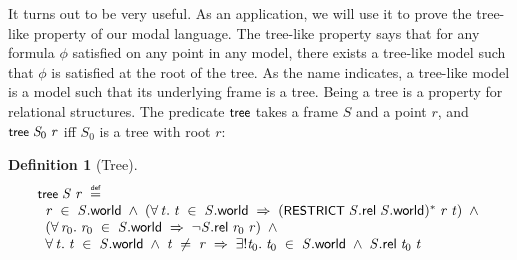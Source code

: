 \documentclass[letterpaper]{article}
\newtheorem{defn}{Definition}
\renewcommand{\HOLConst}[1]{{\textsf{\upshape\small #1}}}
\renewcommand{\HOLinline}[1]{\ensuremath{#1}}
\newenvironment{holmath}{\begin{displaymath}\begin{array}{l}}{\end{array}\end{displaymath}\ignorespacesafterend}
\begin{document}
It turns out to be very useful. As an application, we will use it to prove the tree-like property of our modal language. The tree-like property says that for any formula $\phi$ satisfied on any point in any model, there exists a tree-like model such that $\phi$ is satisfied at the root of the tree. As the name indicates, a tree-like model is a model such that its underlying frame is a tree. Being a tree is a property for relational structures. The predicate \HOLinline{\HOLConst{tree}} takes a frame $S$ and a point $r$, and \HOLinline{\HOLConst{tree}\;\HOLFreeVar{S\sb{\mathrm{0}}}\;\HOLFreeVar{r}} iff $S_0$ is a tree with root $r$:
\begin{defn}[Tree]
\begin{holmath}
   \HOLConst{tree}\;\HOLFreeVar{S}\;\HOLFreeVar{r}\;\HOLSymConst{\HOLTokenDefEquality{}}\\
\;\;\HOLFreeVar{r}\;\HOLSymConst{\HOLTokenIn{}}\;\HOLFreeVar{S}.\HOLFieldName{world}\;\HOLSymConst{\HOLTokenConj{}}\;(\HOLSymConst{\HOLTokenForall{}}\HOLBoundVar{t}.\;\HOLBoundVar{t}\;\HOLSymConst{\HOLTokenIn{}}\;\HOLFreeVar{S}.\HOLFieldName{world}\;\HOLSymConst{\HOLTokenImp{}}\;(\HOLConst{RESTRICT}\;\HOLFreeVar{S}.\HOLFieldName{rel}\;\HOLFreeVar{S}.\HOLFieldName{world})\HOLSymConst{\HOLTokenSupStar{}}\;\HOLFreeVar{r}\;\HOLBoundVar{t})\;\HOLSymConst{\HOLTokenConj{}}\\
\;\;(\HOLSymConst{\HOLTokenForall{}}\HOLBoundVar{r\sb{\mathrm{0}}}.\;\HOLBoundVar{r\sb{\mathrm{0}}}\;\HOLSymConst{\HOLTokenIn{}}\;\HOLFreeVar{S}.\HOLFieldName{world}\;\HOLSymConst{\HOLTokenImp{}}\;\HOLSymConst{\HOLTokenNeg{}}\HOLFreeVar{S}.\HOLFieldName{rel}\;\HOLBoundVar{r\sb{\mathrm{0}}}\;\HOLFreeVar{r})\;\HOLSymConst{\HOLTokenConj{}}\\
\;\;\HOLSymConst{\HOLTokenForall{}}\HOLBoundVar{t}.\;\HOLBoundVar{t}\;\HOLSymConst{\HOLTokenIn{}}\;\HOLFreeVar{S}.\HOLFieldName{world}\;\HOLSymConst{\HOLTokenConj{}}\;\HOLBoundVar{t}\;\HOLSymConst{\HOLTokenNotEqual{}}\;\HOLFreeVar{r}\;\HOLSymConst{\HOLTokenImp{}}\;\HOLSymConst{\HOLTokenUnique{}}\HOLBoundVar{t\sb{\mathrm{0}}}.\;\HOLBoundVar{t\sb{\mathrm{0}}}\;\HOLSymConst{\HOLTokenIn{}}\;\HOLFreeVar{S}.\HOLFieldName{world}\;\HOLSymConst{\HOLTokenConj{}}\;\HOLFreeVar{S}.\HOLFieldName{rel}\;\HOLBoundVar{t\sb{\mathrm{0}}}\;\HOLBoundVar{t}
\end{holmath}
\end{defn}
\end{document}

